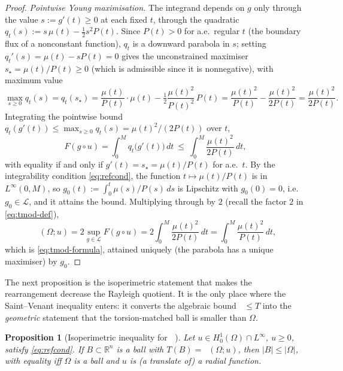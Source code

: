 \documentclass[11pt]{amsart}
\newtheorem{proposition}[theorem]{Proposition}
\theoremstyle{definition}
\newcommand{\R}{\mathbb R}
\newcommand{\Om}{\Omega}
\newcommand{\abs}[1]{\left|#1\right|}
\newcommand{\dt}{\,dt}
\DeclareMathOperator{\Tmod}{T_{\mathrm{mod}}}
\begin{document}
\begin{proof}
\emph{Pointwise Young maximisation.} The integrand depends on $g$ only
through the value $s:=g'(t)\ge0$ at each fixed $t$, through the quadratic
$q_t(s):=s\,\mu(t)-\tfrac12 s^2P(t)$. Since $P(t)>0$ for a.e.\ regular $t$
(the boundary flux of a nonconstant function), $q_t$ is a downward parabola
in $s$; setting $q_t'(s)=\mu(t)-sP(t)=0$ gives the unconstrained maximiser
$s_\star=\mu(t)/P(t)\ge0$ (which is admissible since it is nonnegative), with
maximum value
\[
  \max_{s\ge0}q_t(s)=q_t(s_\star)
  =\frac{\mu(t)}{P(t)}\cdot\mu(t)-\tfrac12\frac{\mu(t)^2}{P(t)^2}\,P(t)
  =\frac{\mu(t)^2}{P(t)}-\frac{\mu(t)^2}{2P(t)}
  =\frac{\mu(t)^2}{2P(t)}.
\]
Integrating the pointwise bound $q_t(g'(t))\le\max_{s\ge0}q_t(s)
=\mu(t)^2/(2P(t))$ over $t$,
\[
  F(g\circ u)=\int_0^M q_t\bigl(g'(t)\bigr)\dt
  \ \le\ \int_0^M\frac{\mu(t)^2}{2P(t)}\dt,
\]
with equality if and only if $g'(t)=s_\star=\mu(t)/P(t)$ for a.e.\ $t$. By
the integrability condition \eqref{eq:refcond}, the function
$t\mapsto\mu(t)/P(t)$ is in $L^\infty(0,M)$, so $g_0(t):=\int_0^t
\mu(s)/P(s)\,ds$ is Lipschitz with $g_0(0)=0$, i.e.\ $g_0\in\mathcal L$, and
it attains the bound. Multiplying through by $2$ (recall the factor $2$ in
\eqref{eq:tmod-def}),
\[
  \Tmod(\Om;u)=2\sup_{g\in\mathcal L}F(g\circ u)
  =2\int_0^M\frac{\mu(t)^2}{2P(t)}\dt
  =\int_0^M\frac{\mu(t)^2}{P(t)}\dt,
\]
which is \eqref{eq:tmod-formula}, attained uniquely (the parabola has a
unique maximiser) by $g_0$.
\end{proof}

The next proposition is the isoperimetric statement that makes the
rearrangement decrease the Rayleigh quotient. It is the only place where
the Saint--Venant inequality enters: it converts the algebraic bound
$\Tmod\le T$ into the \emph{geometric} statement that the torsion-matched
ball is smaller than $\Om$.

\begin{proposition}[Isoperimetric inequality for $\Tmod$]\label{prop:isop-tmod}
Let $u\in H^1_0(\Om)\cap L^\infty$, $u\ge0$, satisfy \eqref{eq:refcond}.
If $B\subset\R^n$ is a ball with $T(B)=\Tmod(\Om;u)$, then $\abs B\le\abs\Om$,
with equality iff $\Om$ is a ball and $u$ is (a translate of) a radial
function.
\end{proposition}
\end{document}
